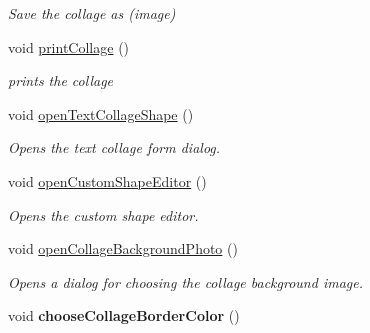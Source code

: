 \begin{DoxyCompactItemize}
\begin{DoxyCompactList}\small\item\em Save the collage as (image) \item\end{DoxyCompactList}\item 
\hypertarget{class_main_window_a506412e8b00790176a97fa171b05aa4c}{
void \hyperlink{class_main_window_a506412e8b00790176a97fa171b05aa4c}{printCollage} ()}
\label{class_main_window_a506412e8b00790176a97fa171b05aa4c}

\begin{DoxyCompactList}\small\item\em prints the collage \item\end{DoxyCompactList}\item 
\hypertarget{class_main_window_ae83d1eb49ae74d14d0a54f3ddb7b15aa}{
void \hyperlink{class_main_window_ae83d1eb49ae74d14d0a54f3ddb7b15aa}{openTextCollageShape} ()}
\label{class_main_window_ae83d1eb49ae74d14d0a54f3ddb7b15aa}

\begin{DoxyCompactList}\small\item\em Opens the text collage form dialog. \item\end{DoxyCompactList}\item 
\hypertarget{class_main_window_a63e212f6bd222ef8eecc0fc98284aa31}{
void \hyperlink{class_main_window_a63e212f6bd222ef8eecc0fc98284aa31}{openCustomShapeEditor} ()}
\label{class_main_window_a63e212f6bd222ef8eecc0fc98284aa31}

\begin{DoxyCompactList}\small\item\em Opens the custom shape editor. \item\end{DoxyCompactList}\item 
\hypertarget{class_main_window_a5c352ca82963609636a4054830ff39b5}{
void \hyperlink{class_main_window_a5c352ca82963609636a4054830ff39b5}{openCollageBackgroundPhoto} ()}
\label{class_main_window_a5c352ca82963609636a4054830ff39b5}

\begin{DoxyCompactList}\small\item\em Opens a dialog for choosing the collage background image. \item\end{DoxyCompactList}\item 
\hypertarget{class_main_window_a800993485cb2fec367315bbbf5e67a5c}{
void {\bfseries chooseCollageBorderColor} ()}
\label{class_main_window_a800993485cb2fec367315bbbf5e67a5c}


\end{DoxyCompactItemize}
